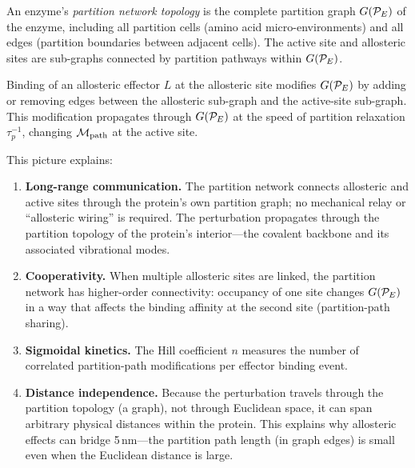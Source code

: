 \begin{definition}
\label{def:allosteric_network}
An enzyme's \emph{partition network topology} is the complete partition graph
$G(\mathcal{P}_E)$ of the enzyme, including all partition cells (amino acid
micro-environments) and all edges (partition boundaries between adjacent
cells). The active site and allosteric sites are sub-graphs connected by
partition pathways within $G(\mathcal{P}_E)$.
\end{definition}

\begin{proposition}
\label{prop:allostery}
Binding of an allosteric effector $L$ at the allosteric site modifies
$G(\mathcal{P}_E)$ by adding or removing edges between the allosteric sub-graph
and the active-site sub-graph. This modification propagates through
$G(\mathcal{P}_E)$ at the speed of partition relaxation $\tau_p^{-1}$, changing
$\mathcal{M}_{\mathrm{path}}$ at the active site.
\end{proposition}

This picture explains:
\begin{enumerate}
  \item \textbf{Long-range communication.} The partition network connects
        allosteric and active sites through the protein's own partition graph;
        no mechanical relay or ``allosteric wiring'' is required. The
        perturbation propagates through the partition topology of the
        protein's interior---the covalent backbone and its associated
        vibrational modes.
  \item \textbf{Cooperativity.} When multiple allosteric sites are linked,
        the partition network has higher-order connectivity: occupancy of
        one site changes $G(\mathcal{P}_E)$ in a way that affects the binding
        affinity at the second site (partition-path sharing).
  \item \textbf{Sigmoidal kinetics.} The Hill coefficient $n$ measures the
        number of correlated partition-path modifications per effector
        binding event.
  \item \textbf{Distance independence.} Because the perturbation travels
        through the partition topology (a graph), not through Euclidean
        space, it can span arbitrary physical distances within the protein.
        This explains why allosteric effects can bridge 5\,nm---the
        partition path length (in graph edges) is small even when the
        Euclidean distance is large.
\end{enumerate}

